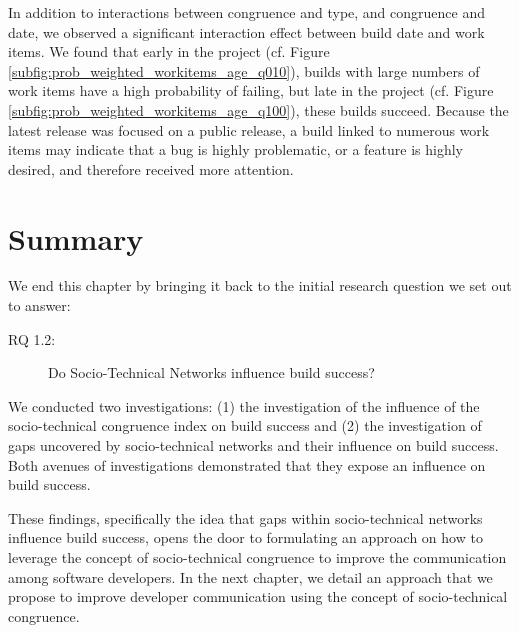 In addition to interactions between congruence and type, and congruence and date, we observed a significant interaction effect between build date and work items.
We found that early in the project (cf. Figure \ref{subfig:prob_weighted_workitems_age_q010}), builds with large numbers of work items have a high probability of failing, but late in the project (cf. Figure \ref{subfig:prob_weighted_workitems_age_q100}), these builds succeed. Because the latest release was focused on a public release, a build linked to numerous work items may indicate that a bug is highly problematic, or a feature is highly desired, and therefore received more attention. 



\section{Summary}
\label{sec:conclusion}
We end this chapter by bringing it back to the initial research question we set out to answer:
\begin{description}
  \item[RQ 1.2:] Do Socio-Technical Networks influence build success?
\end{description}

We conducted two investigations: (1) the investigation of the influence of the socio-technical congruence index on build success and (2) the investigation of gaps uncovered by socio-technical networks and their influence on build success.
Both avenues of investigations demonstrated that they expose an influence on build success.

These findings, specifically the idea that gaps within socio-technical networks influence build success, opens the door to formulating an approach on how to leverage the concept of socio-technical congruence to improve the communication among software developers.
In the next chapter, we detail an approach that we propose to improve developer communication using the concept of socio-technical congruence.
